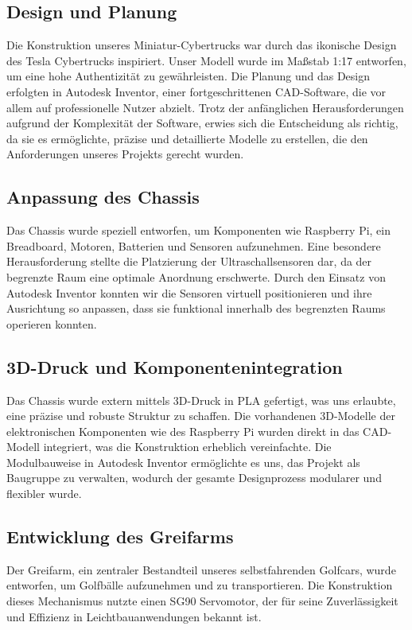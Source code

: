 \subsection{Design und Planung}
Die Konstruktion unseres Miniatur-Cybertrucks war durch das ikonische Design des Tesla Cybertrucks inspiriert. Unser Modell wurde im Maßstab 1:17 entworfen, um eine hohe Authentizität zu gewährleisten. Die Planung und das Design erfolgten in Autodesk Inventor, einer fortgeschrittenen CAD-Software, die vor allem auf professionelle Nutzer abzielt. Trotz der anfänglichen Herausforderungen aufgrund der Komplexität der Software, erwies sich die Entscheidung als richtig, da sie es ermöglichte, präzise und detaillierte Modelle zu erstellen, die den Anforderungen unseres Projekts gerecht wurden.

\newpage

\subsection{Anpassung des Chassis}
Das Chassis wurde speziell entworfen, um Komponenten wie Raspberry Pi, ein Breadboard, Motoren, Batterien und Sensoren aufzunehmen. Eine besondere Herausforderung stellte die Platzierung der Ultraschallsensoren dar, da der begrenzte Raum eine optimale Anordnung erschwerte. Durch den Einsatz von Autodesk Inventor konnten wir die Sensoren virtuell positionieren und ihre Ausrichtung so anpassen, dass sie funktional innerhalb des begrenzten Raums operieren konnten.

\subsection{3D-Druck und Komponentenintegration}
Das Chassis wurde extern mittels 3D-Druck in PLA gefertigt, was uns erlaubte, eine präzise und robuste Struktur zu schaffen. Die vorhandenen 3D-Modelle der elektronischen Komponenten wie des Raspberry Pi wurden direkt in das CAD-Modell integriert, was die Konstruktion erheblich vereinfachte. Die Modulbauweise in Autodesk Inventor ermöglichte es uns, das Projekt als Baugruppe zu verwalten, wodurch der gesamte Designprozess modularer und flexibler wurde.

\subsection{Entwicklung des Greifarms}
Der Greifarm, ein zentraler Bestandteil unseres selbstfahrenden Golfcars, wurde entworfen, um Golfbälle aufzunehmen und zu transportieren. Die Konstruktion dieses Mechanismus nutzte einen SG90 Servomotor, der für seine Zuverlässigkeit und Effizienz in Leichtbauanwendungen bekannt ist.

